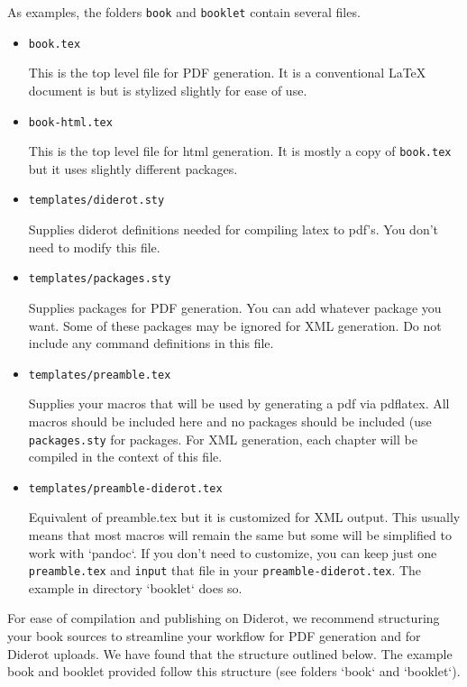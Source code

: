 As examples, 
the folders \lstinline`book` and \lstinline`booklet` contain several files.
%
\begin{itemize}
\item \lstinline`book.tex`

This is the top level file for PDF generation.  It is a conventional LaTeX document is but is stylized slightly for ease of use.  

\item \lstinline`book-html.tex`

This is the top level file for html generation.  It is mostly a copy of \lstinline`book.tex` but it uses slightly different packages.

\item \lstinline`templates/diderot.sty`

Supplies diderot definitions needed for compiling latex to pdf's.
You don't need to modify this file.

\item \lstinline`templates/packages.sty`

Supplies packages for PDF generation.  You can add whatever package you want.  Some of these packages may be ignored for XML generation.   Do not include any command definitions in this file.

\item \lstinline`templates/preamble.tex` 

   Supplies your macros that will be used by generating a pdf via pdflatex.  All macros should be included here and no packages should be included (use \lstinline`packages.sty` for packages.  For XML generation, each chapter will be compiled in the context of this file. 


\item \lstinline`templates/preamble-diderot.tex` 

   Equivalent of preamble.tex but it is customized for XML output.  This usually means that most macros will remain the same but some will be simplified to work with `pandoc`.  If you don't need to customize, you can keep just one \lstinline`preamble.tex` and \lstinline`input` that file in your \lstinline`preamble-diderot.tex`.  The example in directory `booklet` does so.
\end{itemize}    

For ease of compilation and publishing on Diderot, we recommend
structuring your book sources to streamline your workflow for PDF
generation and for Diderot uploads.  We have found that the structure
outlined below.  The example book and booklet provided follow this
structure (see folders `book` and `booklet`).

